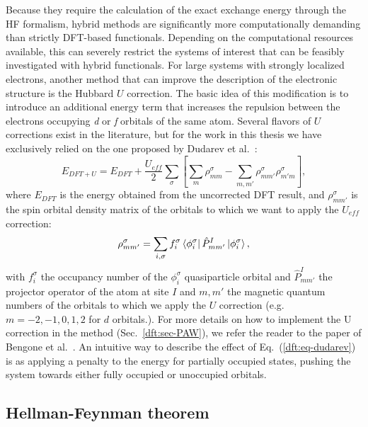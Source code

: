 \begin{refsection}
 \label{dft:sec-dudarev} 
Because they require the calculation of the exact exchange energy through the 
\gls{HF} formalism, hybrid methods are significantly more computationally demanding 
than strictly \gls{DFT}-based functionals. Depending on the computational resources 
available, this can severely restrict the systems of interest that can be 
feasibly investigated with hybrid functionals. For large systems with strongly 
localized electrons, another method that can improve the description of the 
electronic structure is the Hubbard $U$ correction. The basic idea of this 
modification is to introduce an additional energy term that increases the 
repulsion between the electrons occupying \textit{d} or \textit{f} orbitals of 
the same atom. Several flavors of $U$ corrections exist in the literature, 
but for the work in this thesis we have exclusively relied on the one proposed 
by Dudarev et al.~\cite{Dudarev1998}: 
\begin{equation}\label{dft:eq-dudarev} 
E_{DFT+U} = E_{DFT} + \frac{U_{eff}}{2} \sum_\sigma \left[ \sum_m 
\rho_{mm}^\sigma - \sum_{m, m'} \rho_{mm'}^\sigma\rho_{m'm}^\sigma\right], 
\end{equation} 
where $E_{DFT}$ is the energy obtained from the uncorrected \gls{DFT} result, and $\rho^\sigma_{mm'}$ is the spin orbital density matrix of the orbitals to which we 
want to apply the $U_{eff}$ correction:
\begin{equation}
\rho^\sigma_{mm'} = \sum_{i, \sigma} f_i^\sigma \bra{\phi_i^\sigma} \hat{P}_{mm'}^I \ket{\phi_i^\sigma},
\end{equation}
with $f_i^\sigma$ the occupancy number of the $\phi_i^\sigma$ quasiparticle orbital and $\hat{P}_{mm'}^I$ the projector operator of the atom at site $I$ and $m, m'$ the magnetic quantum numbers of the orbitals 
to which we apply the $U$ correction (e.g. $m=-2, -1, 0, 1, 2$ for $d$ 
orbitals.). For more details on how to implement the U correction in the  method (Sec.~\ref{dft:sec-PAW}), we refer the reader to the paper of Bengone et al.~\cite{Bengone2000}. An intuitive way to describe the effect of 
Eq.~(\ref{dft:eq-dudarev}) is as applying a penalty to the energy for partially 
occupied states, pushing the system towards either fully occupied or 
unoccupied orbitals. 

\subsection{Hellman-Feynman theorem} \label{dft:sec-hellmann} 
 

\end{refsection}
